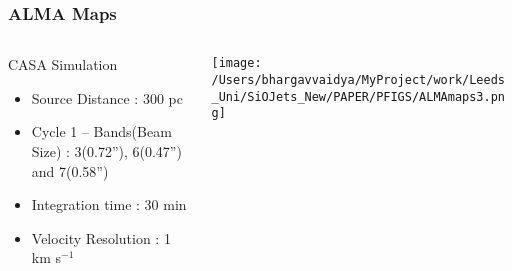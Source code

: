 \documentclass[8pt,xcolor=dvipsnames]{beamer}
\begin{document}
\begin{frame}[t]
\frametitle{ALMA Maps}
\begin{columns}[T]
\begin{column}{0.3\textwidth}
\begin{block}{CASA Simulation}
\begin{itemize}
\item Source Distance : 300 pc 
\item Cycle 1 --  Bands(Beam Size) :  3(0.72''), 6(0.47'') and 7(0.58'') 
\item Integration time : 30 min
\item Velocity Resolution : 1 km s$^{-1}$
\end{itemize}
\end{block}
\end{column}
\begin{column}{0.7\textwidth}
\texttt{[image: /Users/bhargavvaidya/MyProject/work/Leeds\_Uni/SiOJets\_New/PAPER/PFIGS/ALMAmaps3.png]}
\end{column}
\end{columns}
\end{frame}
\end{document}
